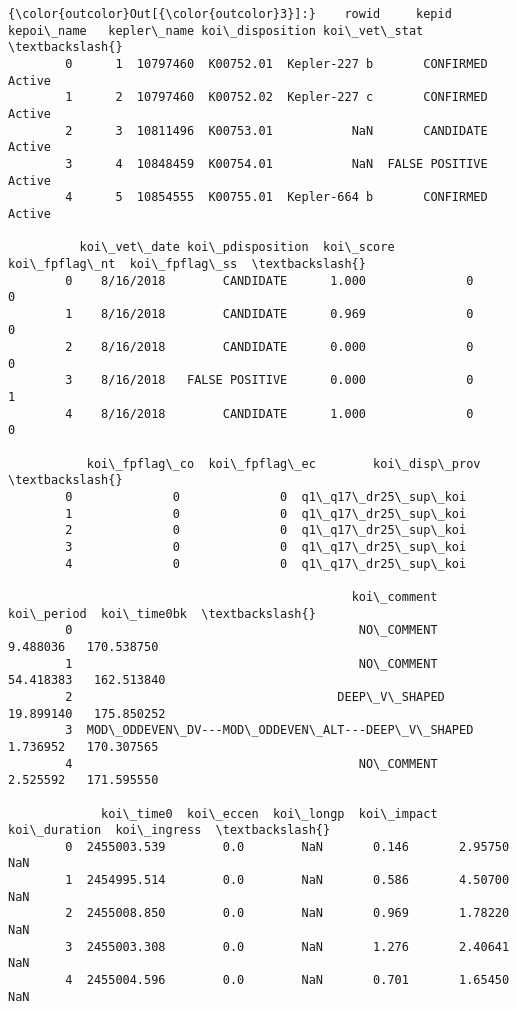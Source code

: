 \documentclass[11pt]{article}
\begin{document}
\begin{Verbatim}[commandchars=\\\{\}]
{\color{outcolor}Out[{\color{outcolor}3}]:}    rowid     kepid kepoi\_name   kepler\_name koi\_disposition koi\_vet\_stat  \textbackslash{}
        0      1  10797460  K00752.01  Kepler-227 b       CONFIRMED       Active   
        1      2  10797460  K00752.02  Kepler-227 c       CONFIRMED       Active   
        2      3  10811496  K00753.01           NaN       CANDIDATE       Active   
        3      4  10848459  K00754.01           NaN  FALSE POSITIVE       Active   
        4      5  10854555  K00755.01  Kepler-664 b       CONFIRMED       Active   
        
          koi\_vet\_date koi\_pdisposition  koi\_score  koi\_fpflag\_nt  koi\_fpflag\_ss  \textbackslash{}
        0    8/16/2018        CANDIDATE      1.000              0              0   
        1    8/16/2018        CANDIDATE      0.969              0              0   
        2    8/16/2018        CANDIDATE      0.000              0              0   
        3    8/16/2018   FALSE POSITIVE      0.000              0              1   
        4    8/16/2018        CANDIDATE      1.000              0              0   
        
           koi\_fpflag\_co  koi\_fpflag\_ec        koi\_disp\_prov  \textbackslash{}
        0              0              0  q1\_q17\_dr25\_sup\_koi   
        1              0              0  q1\_q17\_dr25\_sup\_koi   
        2              0              0  q1\_q17\_dr25\_sup\_koi   
        3              0              0  q1\_q17\_dr25\_sup\_koi   
        4              0              0  q1\_q17\_dr25\_sup\_koi   
        
                                                koi\_comment  koi\_period  koi\_time0bk  \textbackslash{}
        0                                        NO\_COMMENT    9.488036   170.538750   
        1                                        NO\_COMMENT   54.418383   162.513840   
        2                                     DEEP\_V\_SHAPED   19.899140   175.850252   
        3  MOD\_ODDEVEN\_DV---MOD\_ODDEVEN\_ALT---DEEP\_V\_SHAPED    1.736952   170.307565   
        4                                        NO\_COMMENT    2.525592   171.595550   
        
             koi\_time0  koi\_eccen  koi\_longp  koi\_impact  koi\_duration  koi\_ingress  \textbackslash{}
        0  2455003.539        0.0        NaN       0.146       2.95750          NaN   
        1  2454995.514        0.0        NaN       0.586       4.50700          NaN   
        2  2455008.850        0.0        NaN       0.969       1.78220          NaN   
        3  2455003.308        0.0        NaN       1.276       2.40641          NaN   
        4  2455004.596        0.0        NaN       0.701       1.65450          NaN   
        

\end{Verbatim}
\end{document}
